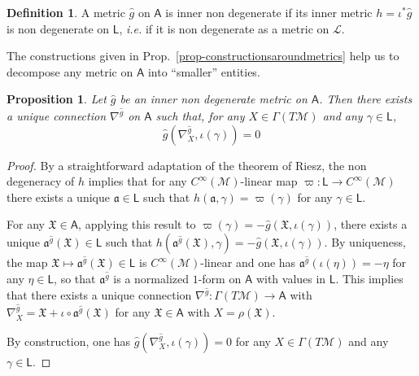 \documentclass[number]{elsarticle}
\newtheorem{proposition}[theorem]{Proposition}
\theoremstyle{definition}
\newtheorem{definition}[theorem]{Definition}
\theoremstyle{remark}
\numberwithin{equation}{section}
\begin{document}
\begin{definition}
A metric ${{\widehat{g}}}$ on ${{{{\mathbf{\mathsf{{A}}}}}}}$ is inner non degenerate if its inner metric $h = \iota^\ast {{\widehat{g}}}$ is non degenerate on ${{{{\mathbf{\mathsf{{L}}}}}}}$, \textit{i.e.} if it is non degenerate as a metric on ${{{{\mathcal{{L}}}}}}$.
\end{definition}

The constructions given in Prop.~\ref{prop-constructionsaroundmetrics} help us to decompose any metric on ${{{{\mathbf{\mathsf{{A}}}}}}}$ into ``smaller'' entities. 

\begin{proposition}
\label{prop-connectionassociatedtoinnernondegeneratemetric}
Let ${{\widehat{g}}}$ be an inner non degenerate metric on ${{{{\mathbf{\mathsf{{A}}}}}}}$. Then there exists a unique connection $\nabla^{{\widehat{g}}}$ on ${{{{\mathbf{\mathsf{{A}}}}}}}$ such that, for any $X \in \Gamma(T{{{{\mathcal{{M}}}}}})$ and any $\gamma \in {{{{\mathbf{\mathsf{{L}}}}}}}$, 
\begin{equation}
\label{eq-blockdiagmetricconnection}
{{\widehat{g}}}(\nabla^{{\widehat{g}}}_X, \iota(\gamma)) = 0
\end{equation}
\end{proposition}

\begin{proof}
By a straightforward adaptation of the theorem of Riesz, the non degeneracy of $h$ implies that for any $C^\infty({{{{\mathcal{{M}}}}}})$-linear map $\varpi : {{{{\mathbf{\mathsf{{L}}}}}}} \rightarrow C^\infty({{{{\mathcal{{M}}}}}})$ there exists a unique ${\mathfrak{a}} \in {{{{\mathbf{\mathsf{{L}}}}}}}$ such that $h({\mathfrak{a}}, \gamma) = \varpi(\gamma)$ for any $\gamma \in {{{{\mathbf{\mathsf{{L}}}}}}}$. 

For any ${{\mathfrak X}} \in {{{{\mathbf{\mathsf{{A}}}}}}}$, applying this result to $\varpi(\gamma) = - {{\widehat{g}}}({{\mathfrak X}}, \iota(\gamma))$, there exists a unique ${\mathfrak{a}}^{{\widehat{g}}}({{\mathfrak X}}) \in {{{{\mathbf{\mathsf{{L}}}}}}}$ such that $h({\mathfrak{a}}^{{\widehat{g}}}({{\mathfrak X}}), \gamma) = - {{\widehat{g}}}({{\mathfrak X}}, \iota(\gamma))$. By uniqueness, the map ${{\mathfrak X}} \mapsto {\mathfrak{a}}^{{\widehat{g}}}({{\mathfrak X}}) \in {{{{\mathbf{\mathsf{{L}}}}}}}$ is $C^\infty({{{{\mathcal{{M}}}}}})$-linear and one has ${\mathfrak{a}}^{{\widehat{g}}}(\iota(\eta)) = -\eta$ for any $\eta \in {{{{\mathbf{\mathsf{{L}}}}}}}$, so that ${\mathfrak{a}}^{{\widehat{g}}}$ is a normalized $1$-form on ${{{{\mathbf{\mathsf{{A}}}}}}}$ with values in ${{{{\mathbf{\mathsf{{L}}}}}}}$. This implies that there exists a unique connection $\nabla^{{\widehat{g}}} : \Gamma(T {{{{\mathcal{{M}}}}}}) \rightarrow {{{{\mathbf{\mathsf{{A}}}}}}}$ with $\nabla^{{\widehat{g}}}_X = {{\mathfrak X}} + \iota \circ {\mathfrak{a}}^{{\widehat{g}}}({{\mathfrak X}})$ for any ${{\mathfrak X}} \in {{{{\mathbf{\mathsf{{A}}}}}}}$ with $X = \rho({{\mathfrak X}})$. 

By construction, one has ${{\widehat{g}}}(\nabla^{{\widehat{g}}}_X, \iota(\gamma)) = 0$ for any $X \in \Gamma(T {{{{\mathcal{{M}}}}}})$ and any $\gamma \in {{{{\mathbf{\mathsf{{L}}}}}}}$.
\end{proof}
\end{document}
